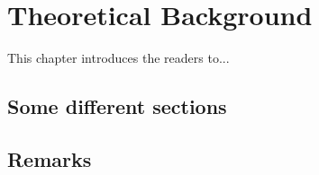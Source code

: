 \chapter{Theoretical Background}
\label{chap:TheoreticalBackground}
\thispagestyle{plain}

\vspace{0.5cm}

\noindent This chapter introduces the readers to...

\section{Some different sections}

\section{Remarks}
